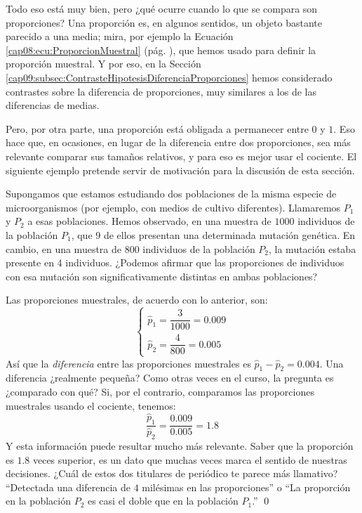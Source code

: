Todo eso está muy bien, pero ¿qué ocurre cuando lo que se compara son proporciones? Una proporción es, en algunos sentidos, un objeto bastante parecido a una media; mira, por ejemplo la Ecuación \ref{cap08:ecu:ProporcionMuestral} (pág. \pageref{cap08:ecu:ProporcionMuestral}), que hemos usado para definir la proporción muestral. Y por eso, en la Sección \ref{cap09:subsec:ContrasteHipotesisDiferenciaProporciones} hemos considerado contrastes sobre la diferencia de proporciones, muy similares a los de las diferencias de medias.

Pero, por otra parte, una proporción está obligada a permanecer entre $0$ y $1$. Eso hace que, en ocasiones, en lugar de la diferencia entre dos proporciones, sea más relevante comparar sus tamaños relativos, y para eso es mejor usar el cociente. El siguiente ejemplo pretende servir de motivación para la discusión de esta sección.
\begin{ejemplo}
Supongamos que estamos estudiando dos poblaciones de la misma especie de microorganismos (por ejemplo, con medios de cultivo diferentes). Llamaremos $P_1$ y $P_2$ a esas poblaciones. Hemos observado, en una muestra de $1000$ individuos de la población $P_1$, que $9$ de ellos presentan una determinada mutación genética. En cambio, en una muestra de $800$ individuos de la población $P_2$, la mutación estaba presente en $4$ individuos. ¿Podemos afirmar que las proporciones de individuos con esa mutación son significativamente distintas en ambas poblaciones?

Las proporciones muestrales, de acuerdo con lo anterior, son:
    \[
    \begin{cases}
        \hat p_1=\dfrac{3}{1000}=0.009\\[3mm]
        \hat p_2=\dfrac{4}{800}=0.005
    \end{cases}
    \]
Así que la {\em diferencia} entre las proporciones muestrales es $\hat p_1-\hat p_2=0.004$. Una diferencia ¿realmente pequeña? Como otras veces en el curso, la pregunta es ¿comparado con qué? Si, por el contrario, comparamos las proporciones muestrales usando el cociente, tenemos:
\[\dfrac{\hat p_1}{\hat p_2}=\dfrac{0.009}{0.005}=1.8\]
Y esta información puede resultar mucho más relevante. Saber que la proporción es $1.8$ veces superior, es un dato que muchas veces marca el sentido de nuestras decisiones. ¿Cuál de estos dos titulares de periódico te parece más llamativo? ``Detectada una diferencia de $4$ milésimas en las proporciones'' o ``La proporción en la población $P_2$ es casi el doble que en la población $P_1$.''
\qed
\end{ejemplo}

